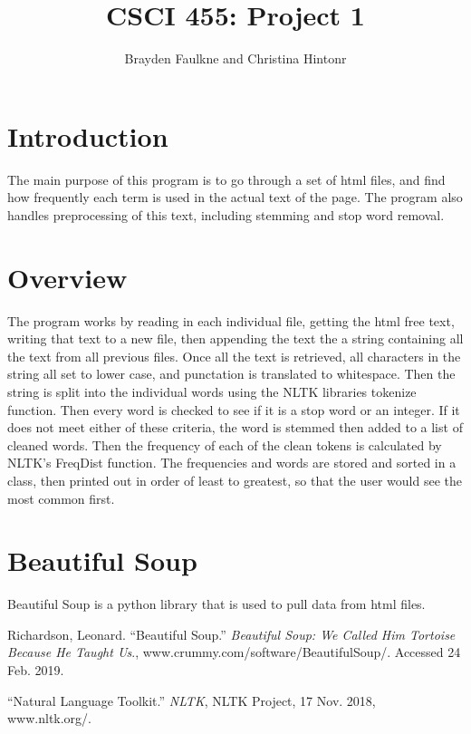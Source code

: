 \documentclass[12pt]{article}
\author{Brayden Faulkne and Christina Hintonr}
\title{CSCI 455: Project 1}
\begin{document}
\maketitle
\section{Introduction}
The main purpose of this program is to go through a set of html files, and find how frequently each term is used in the actual text of the page. The program also handles preprocessing of this text, including stemming and stop word removal. 
\section{Overview}
The program works by reading in each individual file, getting the html free text, writing that text to a new file, then appending the text the a string containing all the text from all previous files. Once all the text is retrieved, all characters in the string all set to lower case, and punctation is translated to whitespace. Then the string is split into the individual words using the NLTK libraries tokenize function. Then every word is checked to see if it is a stop word or an integer. If it does not meet either of these criteria, the word is stemmed then added to a list of cleaned words. Then the frequency of each of the clean tokens is calculated by NLTK's FreqDist function. The frequencies and words are stored and sorted in a class, then printed out in order of least to greatest, so that the user would see the most common first.
\section{Beautiful Soup}
Beautiful Soup is a python library that is used to pull data from html files. 

\begin{thebibliography}{9}
Richardson, Leonard. “Beautiful Soup.” \textit{Beautiful Soup: We Called Him Tortoise Because He Taught Us}., www.crummy.com/software/BeautifulSoup/. Accessed 24 Feb. 2019.

“Natural Language Toolkit.” \textit{NLTK}, NLTK Project, 17 Nov. 2018, www.nltk.org/.
\end{thebibliography}
\end{document}
